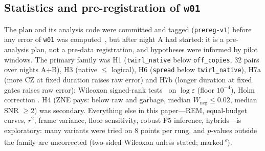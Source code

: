 \documentclass[conference]{IEEEtran}
\newcommand{\arm}[1]{\texttt{#1}}
\newcommand{\expl}{\textsuperscript{\textit{e}}}
\begin{document}
\subsection{Statistics and pre-registration of \texttt{w01}}
The plan and its analysis code were committed and tagged (\texttt{prereg-v1}) before any error
of \texttt{w01} was computed~\cite{nosek2018}, but after night A had started: it is a
pre-analysis plan, not a pre-data registration, and hypotheses were informed by pilot windows.
The primary family was H1 (\arm{twirl\_native} below \arm{off\_copies}, 32 pairs over nights A+B),
H3 (native $\le$ logical), H6 (\arm{spread} below \arm{twirl\_native}), H7a (more CZ at fixed
duration raises raw error) and H7b (longer duration at fixed gates raises raw error): Wilcoxon
signed-rank tests~\cite{wilcoxon1945} on $\log\varepsilon$ (floor $10^{-4}$), Holm correction
\cite{holm1979}. H4 (ZNE pays: below raw and garbage, median $W_{\text{neg}}\le0.02$, median
SNR $\ge2$) was secondary. Everything else in this paper---REM, equal-budget curves, $r^2$,
frame variance, floor sensitivity, robust P5 inference, hybrids---is exploratory: many variants
were tried on 8 points per rung, and $p$-values outside the family are uncorrected (two-sided
Wilcoxon unless stated; marked\,\expl).
\end{document}
